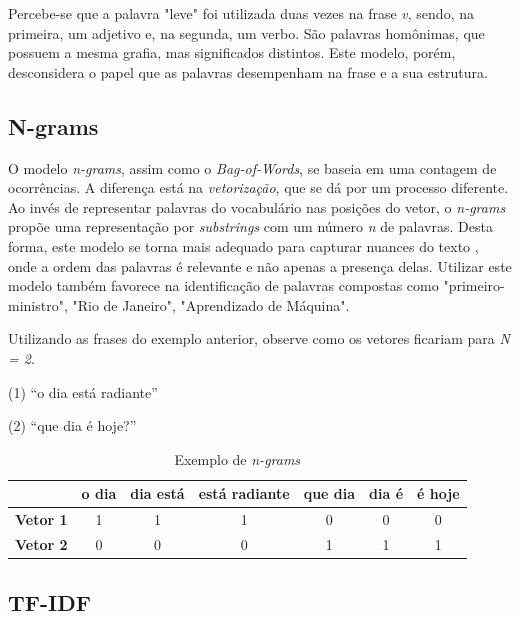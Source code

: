 Percebe-se que a palavra "leve" foi utilizada duas vezes na frase \textit{v}, sendo, na primeira, um adjetivo e, na segunda, um verbo. São palavras homônimas, que possuem a mesma grafia, mas significados distintos. Este modelo, porém, desconsidera o papel que as palavras desempenham na frase e a sua estrutura.

\subsection{N-grams}

O modelo \textit{n-grams}, assim como o \textit{Bag-of-Words}, se baseia em uma contagem de ocorrências. A diferença está na \textit{vetorização}, que se dá por um processo diferente. Ao invés de representar palavras do vocabulário nas posições do vetor, o \textit{n-grams} propõe uma representação por \textit{substrings}  com um número \textit{n} de palavras. Desta forma, este modelo se torna mais adequado para capturar nuances do texto \cite{Lundborg_2017}, onde a ordem das palavras é relevante e não apenas a presença delas. Utilizar este modelo também favorece na identificação de palavras compostas como "primeiro-ministro", "Rio de Janeiro", "Aprendizado de Máquina".

Utilizando as frases do exemplo anterior, observe como os vetores ficariam para \textit{N = 2}.

\begin{samepage}
(1) “o dia está radiante”

\nopagebreak

(2) “que dia é hoje?”
\end{samepage}

\begin{center}
\begin{table}[htbp]
\centering
\begin{tabular}{c|cccccc}
 & \textbf{o dia} & \textbf{dia está} & \textbf{está radiante} & \textbf{que dia} & \textbf{dia é} & \textbf{é hoje} \\ \hline
\textbf{Vetor 1} & 1 & 1 & 1 & 0 & 0 & 0 \\
\textbf{Vetor 2} & 0 & 0 & 0 & 1 & 1 & 1
\end{tabular}
\caption{Exemplo de \textit{n-grams}}
\label{ngrams}
\end{table}
\end{center}

\subsection{TF-IDF}

